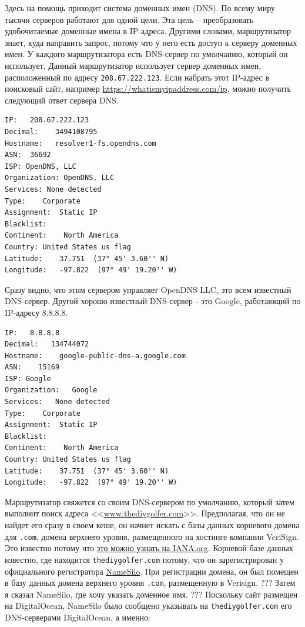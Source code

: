 \documentclass[12pt]{article}
\begin{document}
Здесь на помощь приходит система доменных имен (DNS). По всему миру
тысячи серверов работают для одной цели. Эта цель -- преобразовать
удобочитаемые доменные имена в IP-адреса. Другими словами, маршрутизатор
знает, куда направить запрос, потому что у него есть доступ к серверу
доменных имен. У каждого маршрутизатора есть DNS-сервер по умолчанию,
который он использует. Данный маршрутизатор использует сервер доменных
имен, расположенный по адресу \texttt{208.67.222.123}. Если набрать этот
IP-адрес в поисковый сайт, например
\url{https://whatismyipaddress.com/ip}, можно получить следующий ответ
сервера DNS.

\begin{verbatim}
IP:   208.67.222.123
Decimal:    3494108795
Hostname:   resolver1-fs.opendns.com
ASN:  36692
ISP: OpenDNS, LLC
Organization: OpenDNS, LLC
Services: None detected
Type:    Corporate
Assignment:  Static IP
Blacklist:
Continent:    North America
Country: United States us flag
Latitude:    37.751  (37° 45' 3.60'' N)
Longitude:   -97.822  (97° 49' 19.20'' W)
\end{verbatim}

Сразу видно, что этим сервером управляет OpenDNS LLC, это всем известный
DNS-сервер. Другой хорошо известный DNS-сервер - это Google, работающий
по IP-адресу 8.8.8.8.

\begin{verbatim}
IP:   8.8.8.8
Decimal:   134744072
Hostname:    google-public-dns-a.google.com
ASN:    15169
ISP: Google
Organization:   Google
Services:   None detected
Type:    Corporate
Assignment:  Static IP
Blacklist:
Continent:    North America
Country: United States us flag
Latitude:    37.751  (37° 45' 3.60'' N)
Longitude:   -97.822  (97° 49' 19.20'' W)
\end{verbatim}

Маршрутизатор свяжется со своим DNS-сервером по умолчанию, который затем
выполнит поиск адреса
<<\href{http://www.thediygolfer.com}{www.thediygolfer.com}>>.
Предполагая, что он не найдет его сразу в своем кеше, он начнет искать с
базы данных корневого домена для \texttt{.com}, домена верхнего уровня,
размещенного на хостинге компании VeriSign. Это известно потому что
\href{https://www.iana.org/domains/root/db/com.html}{это можно узнать на
IANA.org}. Корневой базе данных известно, где находится
\texttt{thediygolfer.com} потому, что он зарегистрирован у официального
регистратора
\href{https://www.namesilo.com/register.php?rid=21c9e40dd}{NameSilo}.
При регистрации домена, он был помещен в базу данных домена верхнего
уровня \texttt{.com}, размещенную в Verisign. ??? Затем я сказал
NameSilo, где хочу указать доменное имя. ??? Поскольку сайт размещен на
DigitalOcean, NameSilo было сообщено указывать на
\texttt{thediygolfer.com} его DNS-серверами DigitalOcean, а именно:
\end{document}
